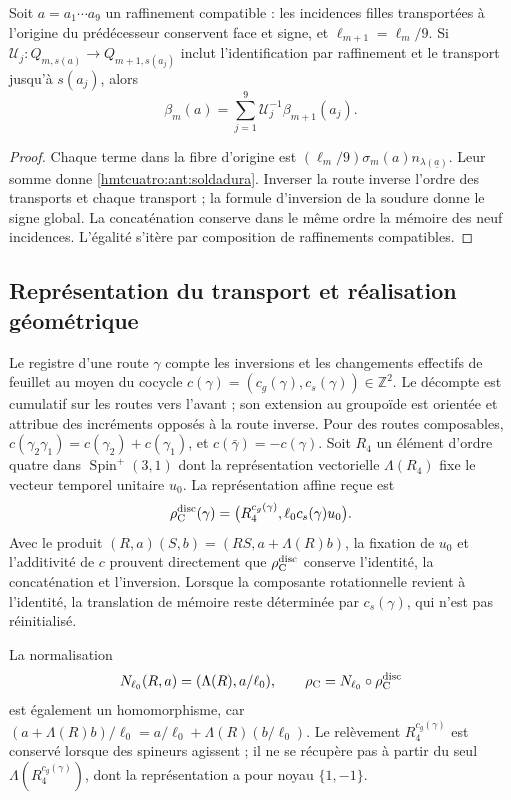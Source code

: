 \begin{proposition}
\label{hmtcuatro:ant:refinamiento-soldadura} Soit \(a=a_1\cdots a_9\) un raffinement compatible : les incidences filles transportées à l’origine du prédécesseur conservent face et signe, et \(\ell_{m+1}=\ell_m/9\). Si \(\mathcal U_j:Q_{m,s(a)}\to Q_{m+1,s(a_j)}\) inclut l’identification par raffinement et le transport jusqu’à \(s(a_j)\), alors
\[
 \beta_m(a)=\sum_{j=1}^9\mathcal U_j^{-1}\beta_{m+1}(a_j).
\]
\end{proposition}
\begin{proof}
Chaque terme dans la fibre d’origine est \((\ell_m/9)\sigma_m(a)n_{\lambda(\underline a)}\). Leur somme donne \eqref{hmtcuatro:ant:soldadura}. Inverser la route inverse l’ordre des transports et chaque transport ; la formule d’inversion de la soudure donne le signe global. La concaténation conserve dans le même ordre la mémoire des neuf incidences. L’égalité s’itère par composition de raffinements compatibles.
\end{proof}

\subsection{Représentation du transport et réalisation géométrique}
\label{hmtcuatro:ant:geometria}

Le registre d’une route \(\gamma\) compte les inversions et les changements effectifs de feuillet au moyen du cocycle \(c(\gamma)=(c_g(\gamma),c_s(\gamma))\in\mathbb Z^2\). Le décompte est cumulatif sur les routes vers l’avant ; son extension au groupoïde est orientée et attribue des incréments opposés à la route inverse. Pour des routes composables, \(c(\gamma_2\gamma_1)=c(\gamma_2)+c(\gamma_1)\), et \(c(\bar\gamma)=-c(\gamma)\). Soit \(R_4\) un élément d’ordre quatre dans \(\operatorname{Spin}^+(3,1)\) dont la représentation vectorielle \(\Lambda(R_4)\) fixe le vecteur temporel unitaire \(u_0\). La représentation affine reçue est
\[
 \rho_{\rm C}^{\rm disc}(\gamma)
 =\bigl(R_4^{c_g(\gamma)},\ell_0c_s(\gamma)u_0\bigr).
\]
Avec le produit \((R,a)(S,b)=(RS,a+\Lambda(R)b)\), la fixation de \(u_0\) et l’additivité de \(c\) prouvent directement que \(\rho_{\rm C}^{\rm disc}\) conserve l’identité, la concaténation et l’inversion. Lorsque la composante rotationnelle revient à l’identité, la translation de mémoire reste déterminée par \(c_s(\gamma)\), qui n’est pas réinitialisé.

La normalisation
\[
 N_{\ell_0}(R,a)=(\Lambda(R),a/\ell_0),\qquad
 \rho_{\rm C}=N_{\ell_0}\circ\rho_{\rm C}^{\rm disc}
\]
est également un homomorphisme, car \((a+\Lambda(R)b)/\ell_0=a/\ell_0+\Lambda(R)(b/\ell_0)\). Le relèvement \(R_4^{c_g(\gamma)}\) est conservé lorsque des spineurs agissent ; il ne se récupère pas à partir du seul \(\Lambda(R_4^{c_g(\gamma)})\), dont la représentation a pour noyau \(\{1,-1\}\).

